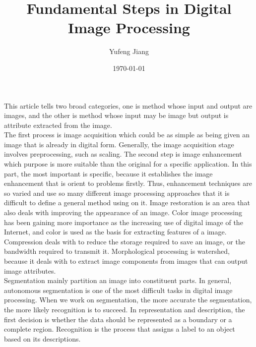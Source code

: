 \documentclass[11pt,oneside]{article}
\title{Fundamental Steps in Digital Image Processing}
\author{Yufeng Jiang}
\date{\today}
\begin{document}
\maketitle
This article tells two broad categories, one is method whose input and output are images, and the other is method whose input may be image but output is attribute extracted from the image.\\
\indent The first process is image acquisition which could be as simple as being given an image that is already in digital form. Generally, the image acquisition stage involves preprocessing, such as scaling. The second step is image enhancement which purpose is more suitable than the original for a specific application. In this part, the most important is specific, because it establishes the image enhancement that is orient to problems firstly. Thus, enhancement techniques are so varied and use so many different image processing approaches that it is difficult to define a general method using on it. Image restoration is an area that also deals with improving the appearance of an image. Color image processing has been gaining more importance as the increasing use of digital image of the Internet, and color is used as the basis for extracting features of a image. Compression deals with to reduce the storage required to save an image, or the bandwidth required to transmit it. Morphological processing is watershed, because it deals with to extract image components from images that can output image attributes. \\
\indent Segmentation mainly partition an image into constituent parts. In general, autonomous segmentation is one of the most difficult tasks in digital image processing. When we work on segmentation, the more accurate the segmentation, the more likely recognition is to succeed. In representation and description, the first decision is whether the data should be represented as a boundary or a complete region. Recognition is the process that assigns a label to an object based on its descriptions.
\end{document}
